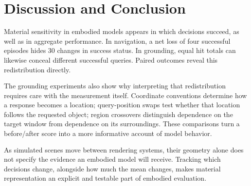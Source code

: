 \section{Discussion and Conclusion}

Material sensitivity in embodied models appears in which decisions succeed,
as well as in aggregate performance. In navigation, a net loss of four successful episodes hides
30 changes in success status. In grounding, equal hit totals can likewise
conceal different successful queries. Paired outcomes reveal this redistribution
directly.

The grounding experiments also show why interpreting that redistribution
requires care with the measurement itself. Coordinate conventions determine how
a response becomes a location; query-position swaps test whether that location
follows the requested object; region crossovers distinguish dependence on the
target window from dependence on its surroundings. These comparisons turn a
before/after score into a more informative account of model behavior.

As simulated scenes move between rendering systems, their geometry alone does
not specify the evidence an embodied model will receive. Tracking which
decisions change, alongside how much the mean changes, makes material
representation an explicit and testable part of embodied evaluation.

